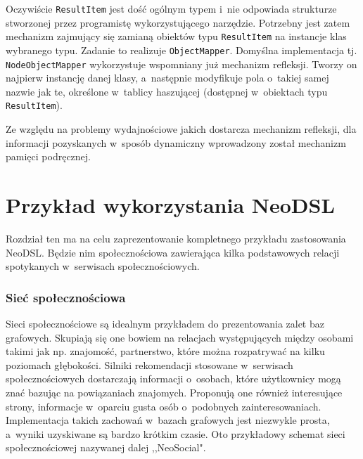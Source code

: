 \documentclass[brudnopis]{xmgr}
\begin{document}
Oczywiście \texttt{ResultItem} jest dość ogólnym typem i~nie odpowiada strukturze stworzonej przez programistę wykorzystującego narzędzie. Potrzebny jest zatem mechanizm zajmujący się zamianą obiektów typu \texttt{ResultItem} na instancje klas wybranego typu. Zadanie to realizuje \texttt{ObjectMapper}. Domyślna implementacja tj. \texttt{NodeObjectMapper} wykorzystuje wspomniany już mechanizm refleksji. Tworzy on najpierw instancję danej klasy, a~następnie modyfikuje pola o~takiej samej nazwie jak te, określone w~tablicy haszującej (dostępnej w~obiektach typu \texttt{ResultItem}).

Ze względu na problemy wydajnościowe jakich dostarcza mechanizm refleksji, dla informacji pozyskanych w~sposób dynamiczny wprowadzony został mechanizm pamięci podręcznej.

\chapter{Przykład wykorzystania NeoDSL}

Rozdział ten ma na celu zaprezentowanie kompletnego przykładu zastosowania NeoDSL. Będzie nim społecznościowa zawierająca kilka podstawowych relacji spotykanych w~serwisach społecznościowych.

\subsection{Sieć społecznościowa}

Sieci społecznościowe są idealnym przykładem do prezentowania zalet baz grafowych. Skupiają się one bowiem na relacjach występujących między osobami takimi jak np. znajomość, partnerstwo, które można rozpatrywać na kilku poziomach głębokości. Silniki rekomendacji stosowane w~serwisach społecznościowych dostarczają informacji o~osobach, które użytkownicy mogą znać bazując na powiązaniach znajomych. Proponują one również interesujące strony, informacje w~oparciu gusta osób o~podobnych zainteresowaniach. Implementacja takich zachowań w~bazach grafowych jest niezwykle prosta, a~wyniki uzyskiwane są bardzo krótkim czasie. Oto przykładowy schemat sieci społecznościowej nazywanej dalej ,,NeoSocial".
\end{document}
